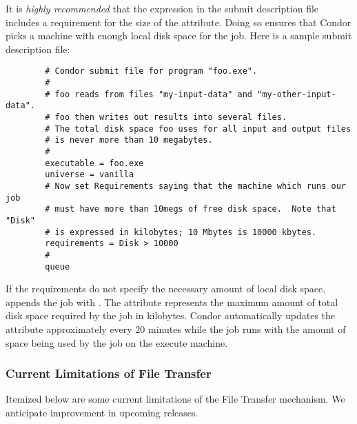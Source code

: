 It is \emph{highly recommended} that the 
expression in the submit description file includes
a requirement for the size of the
 attribute.  Doing so ensures
that Condor picks a machine with enough local disk space for the job.
Here is a sample submit description file:

\begin{verbatim}
        # Condor submit file for program "foo.exe".
        #
        # foo reads from files "my-input-data" and "my-other-input-data".
        # foo then writes out results into several files.
        # The total disk space foo uses for all input and output files
        # is never more than 10 megabytes.
        #
        executable = foo.exe
        universe = vanilla
        # Now set Requirements saying that the machine which runs our job
        # must have more than 10megs of free disk space.  Note that "Disk"
        # is expressed in kilobytes; 10 Mbytes is 10000 kbytes.
        requirements = Disk > 10000
        # 
        queue
\end{verbatim}

If the requirements do not specify the necessary amount of
local disk space,
 appends the job  with
.  The  attribute 
represents the maximum amount of total disk space required by the
job in kilobytes.  Condor automatically updates the 
attribute
approximately every 20 minutes while the job runs with the
amount of space being
used by the job on the execute machine.  

\subsubsection{Current Limitations of File Transfer}

Itemized below are some current limitations of the File Transfer mechanism.  We
anticipate improvement in upcoming releases.

